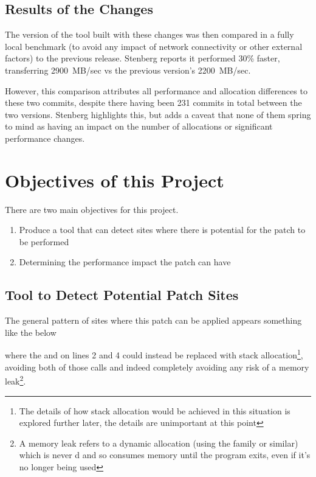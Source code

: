 \subsection{Results of the Changes}

The version of the tool built with these changes was then compared in a fully local benchmark (to avoid any impact of network connectivity or other external factors) to the previous release. Stenberg reports it performed 30\% faster, transferring 2900~MB/sec vs the previous version's 2200~MB/sec.

However, this comparison attributes all performance and allocation differences to these two commits, despite there having been 231 commits in total between the two versions. Stenberg highlights this, but adds a caveat that none of them spring to mind as having an impact on the number of allocations or significant performance changes.

\section{Objectives of this Project}

There are two main objectives for this project.

\begin{enumerate}
	\item Produce a tool that can detect sites where there is potential for the patch to be performed
	\item Determining the performance impact the patch can have
\end{enumerate}

\subsection{Tool to Detect Potential Patch Sites}

The general pattern of sites where this patch can be applied appears something like the below



where the \malloc{} and \free{} on lines 2 and 4 could instead be replaced with stack allocation\footnote{The details of how stack allocation would be achieved in this situation is explored further later, the details are unimportant at this point}, avoiding both of those calls and indeed completely avoiding any risk of a memory leak\footnote{A memory leak refers to a dynamic allocation (using the \malloc{} family or similar) which is never \free{}d and so consumes memory until the program exits, even if it's no longer being used}.

